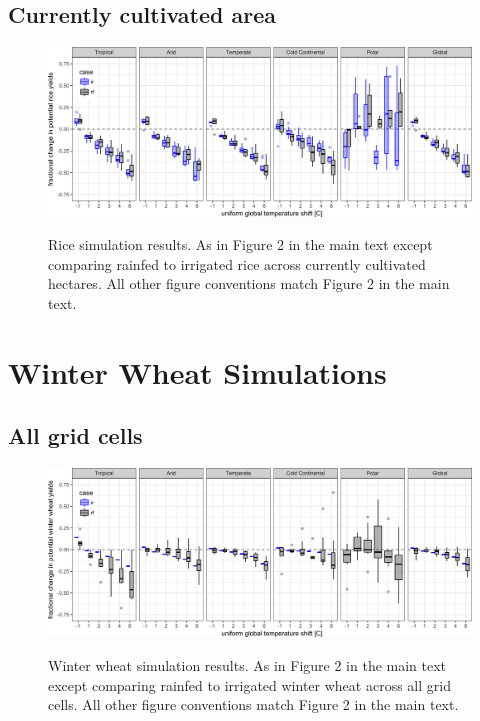 \documentclass[10pt]{article}
\begin{document}
\subsection{Currently cultivated area}
\begin{figure}[h!]
\includegraphics[width=\textwidth]{s_rice_sim_CG_area_weight.png}\\
\caption{Rice simulation results. As in Figure 2 in the main text except comparing rainfed to irrigated rice across currently cultivated hectares. All other figure conventions match Figure 2 in the main text.}
\label{fig:maizeCG}
\end{figure}

\clearpage
\section{Winter Wheat Simulations}
\subsection{All grid cells}
\begin{figure}[h!]
\includegraphics[width=\textwidth]{s_winter_wheat_sim_CG.png}\\
\caption{Winter wheat simulation results. As in Figure 2 in the main text except comparing rainfed to irrigated winter wheat across all grid cells. All other figure conventions match Figure 2 in the main text.}
\label{fig:maizeCG}
\end{figure}
\end{document}

